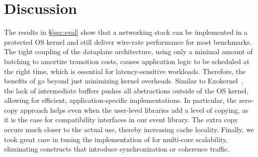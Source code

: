 
\section{Discussion}
\label{sec:disc}


 The results in \S\ref{sec:eval}
show that a networking stack can be implemented in a protected OS
kernel and still deliver wire-rate performance for most benchmarks.
The tight coupling of the dataplane architecture, using only a minimal
amount of batching to amortize transition costs, causes application
logic to be scheduled at the right time, which is essential for
latency-sensitive workloads.  Therefore, the benefits of \ix go beyond
just minimizing kernel overheads. Similar to
Exokernel~\cite{DBLP:conf/sosp/EnglerKO95}, the lack of intermediate
buffers pushes all abstractions outside of the OS kernel, allowing for
efficient, application-specific implementations.  In particular, the
zero-copy approach helps even when the user-level libraries add a
level of copying, as it is the case for compatibility interfaces in
our event library.  The extra copy occurs much closer to the actual
use, thereby increasing cache locality.  Finally, we took great care
in tuning the implementation of \ix for multi-core scalability,
eliminating constructs that introduce synchronization or coherence
traffic.



